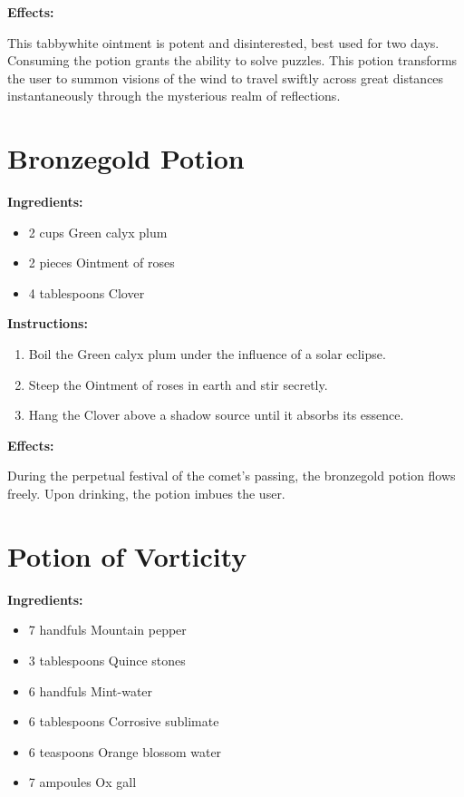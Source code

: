\documentclass{article}
\begin{document}
\textbf{Effects:}

This tabbywhite ointment is potent and disinterested, best used for two days. Consuming the potion grants the ability to solve puzzles. This potion transforms the user to summon visions of the wind to travel swiftly across great distances instantaneously through the mysterious realm of reflections.

\newpage
\section*{Bronzegold Potion}

\textbf{Ingredients:}

\begin{itemize}
  \item 2 cups Green calyx plum
  \item 2 pieces Ointment of roses
  \item 4 tablespoons Clover
\end{itemize}

\textbf{Instructions:}

\begin{enumerate}
  \item Boil the Green calyx plum under the influence of a solar eclipse.
  \item Steep the Ointment of roses in earth and stir secretly.
  \item Hang the Clover above a shadow source until it absorbs its essence.
\end{enumerate}

\textbf{Effects:}

During the perpetual festival of the comet’s passing, the bronzegold potion flows freely. Upon drinking, the potion imbues the user.

\newpage
\section*{Potion of Vorticity}

\textbf{Ingredients:}

\begin{itemize}
  \item 7 handfuls Mountain pepper
  \item 3 tablespoons Quince stones
  \item 6 handfuls Mint-water
  \item 6 tablespoons Corrosive sublimate
  \item 6 teaspoons Orange blossom water
  \item 7 ampoules Ox gall
\end{itemize}
\end{document}
